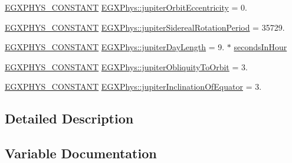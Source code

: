 \begin{DoxyCompactItemize}
\item 
\mbox{\hyperlink{group___e_g_x_phys-_constants-_macros_ga76980d288494ce1714c9ac68a95ba702}{E\+G\+X\+P\+H\+Y\+S\+\_\+\+C\+O\+N\+S\+T\+A\+NT}} \mbox{\hyperlink{group___e_g_x_phys-_constants-_astrophysics-_solar_system-_mercury-_orbit_gac92e819ec6b74b0db751948b503ae776}{E\+G\+X\+Phys\+::jupiter\+Orbit\+Eccentricity}} = 0.
\item 
\mbox{\hyperlink{group___e_g_x_phys-_constants-_macros_ga76980d288494ce1714c9ac68a95ba702}{E\+G\+X\+P\+H\+Y\+S\+\_\+\+C\+O\+N\+S\+T\+A\+NT}} \mbox{\hyperlink{group___e_g_x_phys-_constants-_astrophysics-_solar_system-_mercury-_orbit_gadcd54280d32940fa38030456c9978303}{E\+G\+X\+Phys\+::jupiter\+Sidereal\+Rotation\+Period}} = 35729.
\item 
\mbox{\hyperlink{group___e_g_x_phys-_constants-_macros_ga76980d288494ce1714c9ac68a95ba702}{E\+G\+X\+P\+H\+Y\+S\+\_\+\+C\+O\+N\+S\+T\+A\+NT}} \mbox{\hyperlink{group___e_g_x_phys-_constants-_astrophysics-_solar_system-_mercury-_orbit_ga9f7093c7f773b93f4155fb35a0d36665}{E\+G\+X\+Phys\+::jupiter\+Day\+Length}} = 9. $\ast$ \mbox{\hyperlink{namespace_e_g_x_phys_a7c3165cd93e36f1fb8e9fef80f117bef}{seconds\+In\+Hour}}
\item 
\mbox{\hyperlink{group___e_g_x_phys-_constants-_macros_ga76980d288494ce1714c9ac68a95ba702}{E\+G\+X\+P\+H\+Y\+S\+\_\+\+C\+O\+N\+S\+T\+A\+NT}} \mbox{\hyperlink{group___e_g_x_phys-_constants-_astrophysics-_solar_system-_mercury-_orbit_ga80cd2231e9fa0fb10ecf5ea62fdc0ddb}{E\+G\+X\+Phys\+::jupiter\+Obliquity\+To\+Orbit}} = 3.
\item 
\mbox{\hyperlink{group___e_g_x_phys-_constants-_macros_ga76980d288494ce1714c9ac68a95ba702}{E\+G\+X\+P\+H\+Y\+S\+\_\+\+C\+O\+N\+S\+T\+A\+NT}} \mbox{\hyperlink{group___e_g_x_phys-_constants-_astrophysics-_solar_system-_mercury-_orbit_ga9d8885ca3f314c675788ceec89e3a933}{E\+G\+X\+Phys\+::jupiter\+Inclination\+Of\+Equator}} = 3.
\end{DoxyCompactItemize}


\subsection{Detailed Description}


\subsection{Variable Documentation}
\mbox{\label{group___e_g_x_phys-_constants-_astrophysics-_solar_system-_mercury-_orbit_ga8257f4e64891502c2027114ba8003fb6}} 
